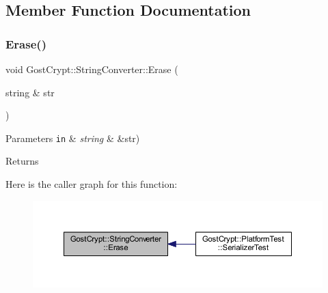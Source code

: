 \subsection{Member Function Documentation}
\mbox{\label{class_gost_crypt_1_1_string_converter_ac5fac70dd45743a6bea8b1a1025a5e2d}} 
\subsubsection{\texorpdfstring{Erase()}{Erase()}\hspace{0.1cm}{\footnotesize\ttfamily [1/2]}}
{\footnotesize\ttfamily void Gost\+Crypt\+::\+String\+Converter\+::\+Erase (\begin{DoxyParamCaption}\item[{string \&}]{str }\end{DoxyParamCaption})\hspace{0.3cm}{\ttfamily [static]}}


\begin{DoxyParams}[1]{Parameters}
\mbox{\tt in}  & {\em string} & \&str) \\
\hline
\end{DoxyParams}
\begin{DoxyReturn}{Returns}

\end{DoxyReturn}
Here is the caller graph for this function\+:
\nopagebreak
\begin{figure}[H]
\begin{center}
\leavevmode
\includegraphics[width=350pt]{class_gost_crypt_1_1_string_converter_ac5fac70dd45743a6bea8b1a1025a5e2d_icgraph}
\end{center}
\end{figure}
\mbox{\label{class_gost_crypt_1_1_string_converter_a6037e1542308e7d01ddfc048edc0df35}} 
